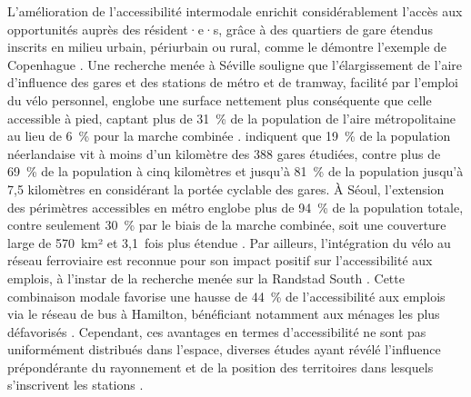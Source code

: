 \begin{refsegment}
L'amélioration de l'accessibilité intermodale enrichit considérablement l'accès aux opportunités auprès des résident·e·s, grâce à des quartiers de gare étendus inscrits en milieu urbain, périurbain ou rural, comme le démontre l'exemple de Copenhague \textcolor{blue}{\autocite[222]{djurhuus_building_2016}}. Une recherche menée à Séville souligne que l'élargissement de l'aire d'influence des gares et des stations de métro et de tramway, facilité par l'emploi du vélo personnel, englobe une surface nettement plus conséquente que celle accessible à pied, captant plus de 31~\% de la population de l'aire métropolitaine au lieu de 6~\% pour la marche combinée \textcolor{blue}{\autocite[22]{marques_potential_2017}}. \textcolor{blue}{\textcite[213]{kager_characterisation_2016}} indiquent que 19~\% de la population néerlandaise vit à moins d'un kilomètre des 388 gares étudiées, contre plus de 69~\% de la population à cinq kilomètres et jusqu'à 81~\% de la population jusqu'à 7,5 kilomètres en considérant la portée cyclable des gares. À Séoul, l'extension des périmètres accessibles en métro englobe plus de 94~\% de la population totale, contre seulement 30~\% par le biais de la marche combinée, soit une couverture large de 570~km² et 3,1~fois plus étendue \textcolor{blue}{\autocite[982]{lee_bicycle-based_2016}}. Par ailleurs, l'intégration du vélo au réseau ferroviaire est reconnue pour son impact positif sur l'accessibilité aux emplois, à l'instar de la recherche menée sur la Randstad South \textcolor{blue}{\autocite[7]{geurs_multi-modal_2016}}. Cette combinaison modale favorise une hausse de 44~\% de l'accessibilité aux emplois via le réseau de bus à Hamilton, bénéficiant notamment aux ménages les plus défavorisés \textcolor{blue}{\autocite[10]{zuo_first-and-last_2020}}. Cependant, ces avantages en termes d'accessibilité ne sont pas uniformément distribués dans l'espace, diverses études ayant révélé l'influence prépondérante du rayonnement et de la position des territoires dans lesquels s'inscrivent les stations \textcolor{blue}{\autocite[9]{yu_understanding_2021}}.%


\end{refsegment}
